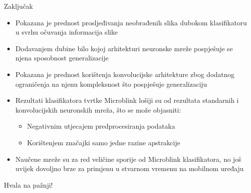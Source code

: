 \documentclass[pdf]{beamer}
\begin{document}
\begin{frame}{Zaključak}

\begin{itemize}
\setlength\itemsep{0.5em}

	\item  Pokazana je prednost prosljeđivanja neobrađenih slika dubokom klasifikatoru u svrhu očuvanja informacija slike 
	
	\item  Dodavanjem dubine bilo kojoj arhitekturi neuronske mreže pospješuje se njena sposobnost generalizacije
	
	\item Pokazana je prednost korištenja konvolucijske arhitekture zbog dodatnog ograničenja na njenu kompleksnost što pospješuje generalizaciju


	\item Rezultati klasifikatora tvrtke Microblink lošiji su od rezultata standarnih i konvolucijskih neuronskih mreža, što se može objasniti:
	 \begin{itemize}
 		\item  Negativnim utjecajem predprocesiranja podataka
 		\item Korištenjem značajki samo jedne razine apstrakcije
 \end{itemize}

	\item Naučene mreže su za red veličine sporije od Microblink klasifikatora, no još uvijek dovoljno brze za primjenu u stvarnom vremenu na mobilnom uređaju
	
\end{itemize} 
 
\end{frame}

\begin{frame}

\begin{center}
\large
 Hvala na pažnji!
\end{center}

\end{frame}
\end{document}
